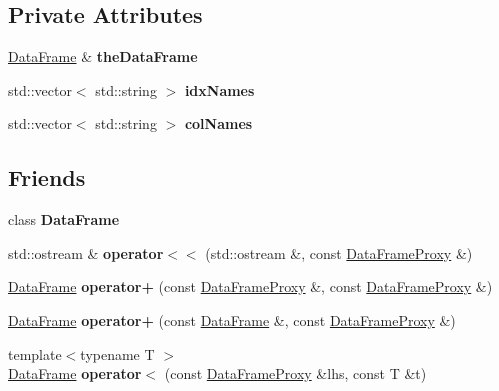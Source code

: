 \subsection*{Private Attributes}
\begin{DoxyCompactItemize}
\item 
\mbox{\label{classDataFrame_1_1DataFrameProxy_a084054173a10f1494e0748c68e06fb3a}} 
\hyperlink{classDataFrame}{Data\+Frame} \& {\bfseries the\+Data\+Frame}
\item 
\mbox{\label{classDataFrame_1_1DataFrameProxy_a1942a4c7499ed555a333b555c8ad9aab}} 
std\+::vector$<$ std\+::string $>$ {\bfseries idx\+Names}
\item 
\mbox{\label{classDataFrame_1_1DataFrameProxy_a0ba3f257ca6e7506dda6ec39a1db414d}} 
std\+::vector$<$ std\+::string $>$ {\bfseries col\+Names}
\end{DoxyCompactItemize}
\subsection*{Friends}
\begin{DoxyCompactItemize}
\item 
\mbox{\label{classDataFrame_1_1DataFrameProxy_ac3cf826bc43b8ab4740915b5c60e7166}} 
class {\bfseries Data\+Frame}
\item 
\mbox{\label{classDataFrame_1_1DataFrameProxy_a178f043594e713eaa0bc4c427cfa7fcd}} 
std\+::ostream \& {\bfseries operator$<$$<$} (std\+::ostream \&, const \hyperlink{classDataFrame_1_1DataFrameProxy}{Data\+Frame\+Proxy} \&)
\item 
\mbox{\label{classDataFrame_1_1DataFrameProxy_ac7252ac5b8145feb97ce0b16040cdbde}} 
\hyperlink{classDataFrame}{Data\+Frame} {\bfseries operator+} (const \hyperlink{classDataFrame_1_1DataFrameProxy}{Data\+Frame\+Proxy} \&, const \hyperlink{classDataFrame_1_1DataFrameProxy}{Data\+Frame\+Proxy} \&)
\item 
\mbox{\label{classDataFrame_1_1DataFrameProxy_a32fc0676af70bd35bf83e11c9ab946fc}} 
\hyperlink{classDataFrame}{Data\+Frame} {\bfseries operator+} (const \hyperlink{classDataFrame}{Data\+Frame} \&, const \hyperlink{classDataFrame_1_1DataFrameProxy}{Data\+Frame\+Proxy} \&)
\item 
\mbox{\label{classDataFrame_1_1DataFrameProxy_aaa1e3264e141ab931043d7f50c784394}} 
{\footnotesize template$<$typename T $>$ }\\\hyperlink{classDataFrame}{Data\+Frame} {\bfseries operator$<$} (const \hyperlink{classDataFrame_1_1DataFrameProxy}{Data\+Frame\+Proxy} \&lhs, const T \&t)
\end{DoxyCompactItemize}


